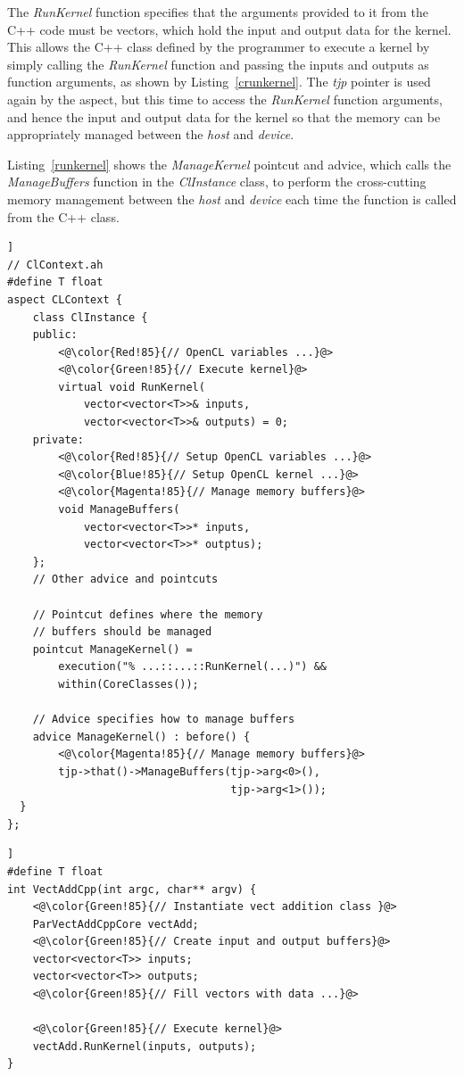 \documentclass{sig-alternate-05-2015}
\begin{document}
The \textit{RunKernel} function specifies that the arguments provided to it from the
C++ code must be vectors, which hold the input and output data for the
kernel. This
allows the C++ class defined by the programmer to execute a kernel by simply calling the
\textit{RunKernel} function and passing the inputs and outputs as function
arguments, as shown by Listing~\ref{crunkernel}. The \textit{tjp} pointer is 
used again by the aspect, but this time to access the \textit{RunKernel} function arguments, 
and hence the input and output data for the kernel so that the memory can be
appropriately managed between the \textit{host} and \textit{device}.

Listing~\ref{runkernel} shows the \textit{ManageKernel} pointcut and advice,
which calls the \textit{ManageBuffers} function in the \textit{ClInstance}
class, to perform the cross-cutting memory management between the \textit{host} and
\textit{device} each time the  function is called from the C++
class.

\begin{lstlisting}[caption=Abstract aspect components which hide kernel
cross-cutting concerns,label=runkernel,float=[!t]]
// ClContext.ah
#define T float
aspect CLContext {
	class ClInstance {
	public:
		<@\color{Red!85}{// OpenCL variables ...}@>
		<@\color{Green!85}{// Execute kernel}@>
		virtual void RunKernel(
			vector<vector<T>>& inputs,
			vector<vector<T>>& outputs) = 0;
	private:
		<@\color{Red!85}{// Setup OpenCL variables ...}@>
		<@\color{Blue!85}{// Setup OpenCL kernel ...}@>
		<@\color{Magenta!85}{// Manage memory buffers}@>
		void ManageBuffers(
			vector<vector<T>>* inputs,
			vector<vector<T>>* outptus);
	};
	// Other advice and pointcuts 

	// Pointcut defines where the memory 
	// buffers should be managed
	pointcut ManageKernel() = 
		execution("% ...::...::RunKernel(...)") &&
		within(CoreClasses());

	// Advice specifies how to manage buffers
	advice ManageKernel() : before() {
		<@\color{Magenta!85}{// Manage memory buffers}@>
		tjp->that()->ManageBuffers(tjp->arg<0>(),
								   tjp->arg<1>());
  }
};
\end{lstlisting}

\begin{lstlisting}[caption=C++ core class executing a pallel kernel using
C++,label=crunkernel,float=[!t]]
#define T float
int VectAddCpp(int argc, char** argv) {
	<@\color{Green!85}{// Instantiate vect addition class }@>
	ParVectAddCppCore vectAdd;
	<@\color{Green!85}{// Create input and output buffers}@>
	vector<vector<T>> inputs;
	vector<vector<T>> outputs;
	<@\color{Green!85}{// Fill vectors with data ...}@>
  
	<@\color{Green!85}{// Execute kernel}@>
	vectAdd.RunKernel(inputs, outputs);
}
\end{lstlisting}
\end{document}
